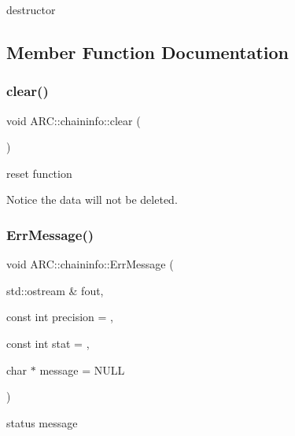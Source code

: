 destructor 



\subsection{Member Function Documentation}
\hypertarget{classARC_1_1chaininfo_ae65957f4d894671dd467a376b898e1a5}{}\label{classARC_1_1chaininfo_ae65957f4d894671dd467a376b898e1a5} 
\subsubsection{\texorpdfstring{clear()}{clear()}}
{\footnotesize\ttfamily void A\+R\+C\+::chaininfo\+::clear (\begin{DoxyParamCaption}{ }\end{DoxyParamCaption})\hspace{0.3cm}{\ttfamily [inline]}}



reset function 

Notice the data will not be deleted. \hypertarget{classARC_1_1chaininfo_a07ad3dcb9540f02984195045357166b0}{}\label{classARC_1_1chaininfo_a07ad3dcb9540f02984195045357166b0} 
\subsubsection{\texorpdfstring{Err\+Message()}{ErrMessage()}}
{\footnotesize\ttfamily void A\+R\+C\+::chaininfo\+::\+Err\+Message (\begin{DoxyParamCaption}\item[{std\+::ostream \&}]{fout,  }\item[{const int}]{precision = {},  }\item[{const int}]{stat = {},  }\item[{char $\ast$}]{message = {\ttfamily NULL} }\end{DoxyParamCaption})\hspace{0.3cm}{\ttfamily [inline]}}



status message 

